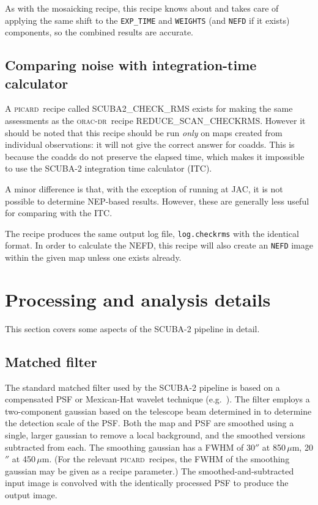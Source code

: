 \documentclass[twoside,11pt,nolof]{starlink}
\providecommand{\oracdr}{\textsc{orac-dr}}
\providecommand{\picard}{\textsc{picard}}
\providecommand{\task}[1]{\textsf{#1}}
\begin{document}
As with the mosaicking recipe, this recipe knows about and takes care
of applying the same shift to the \verb+EXP_TIME+ and \verb+WEIGHTS+
(and \verb+NEFD+ if it exists) components, so the combined results are
accurate.

\subsection{Comparing noise with integration-time calculator\label{se:checkrms}}

A \picard\ recipe called \task{SCUBA2\_CHECK\_RMS} exists for making
the same assessments as the \oracdr\ recipe
\task{REDUCE\_SCAN\_CHECKRMS}. However it should be noted that this
recipe should be run \textit{only} on maps created from individual
observations: it will not give the correct answer for coadds. This is
because the coadds do not preserve the elapsed time, which makes it
impossible to use the SCUBA-2 integration time calculator (ITC).

A minor difference is that, with the exception of running at JAC, it
is not possible to determine NEP-based results. However, these are
generally less useful for comparing with the ITC.

The recipe produces the same output log file, \texttt{log.checkrms}
with the identical format. In order to calculate the NEFD, this recipe
will also create an \verb+NEFD+ image within the given map unless one
exists already.


\section{Processing and analysis details\label{procdetails}}

This section covers some aspects of the SCUBA-2 pipeline in detail.

\subsection{Matched filter}

The standard matched filter used by the SCUBA-2 pipeline is based on a
compensated PSF or Mexican-Hat wavelet technique
(e.g.\ \cite{mhwpaper}). The filter employs a two-component gaussian
based on the telescope beam determined in \cite{scuba2calpaper} to
determine the detection scale of the PSF. Both the map and PSF are
smoothed using a single, larger gaussian to remove a local background,
and the smoothed versions subtracted from each. The smoothing gaussian
has a FWHM of 30$''$ at 850\,$\mu$m, 20$''$ at 450\,$\mu$m. (For the
relevant \picard\ recipes, the FWHM of the smoothing gaussian may be
given as a recipe parameter.) The smoothed-and-subtracted input image
is convolved with the identically processed PSF to produce the output
image.
\end{document}
